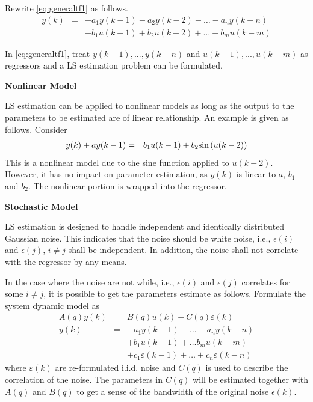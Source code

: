 Rewrite \eqref{eq:generaltf1} as follows.
\begin{eqnarray}
  y(k) &=& - a_1y(k-1) - a_2y(k-2) - \ldots - a_ny(k-n) \nonumber \\ && + b_1u(k-1) + b_2u(k-2) + \ldots + b_mu(k-m) \label{eq:generaltf1}
\end{eqnarray}

In \eqref{eq:generaltf1}, treat $y(k-1), ..., y(k-n)$ and $u(k-1), ..., u(k-m)$ as regressors and a LS estimation problem can be formulated.

\vspace{0.1in}
\noindent \textbf{Nonlinear Model}
\vspace{0.1in}

LS estimation can be applied to nonlinear models as long as the output to the parameters to be estimated are of linear relationship. An example is given as follows. Consider
\begin{eqnarray}
  y(k) + ay(k-1) &=& b_1u(k-1) + b_2 \textup{sin}\left(u(k-2)\right) \nonumber
\end{eqnarray}
This is a nonlinear model due to the sine function applied to $u(k-2)$. However, it has no impact on parameter estimation, as $y(k)$ is linear to $a$, $b_1$ and $b_2$. The nonlinear portion is wrapped into the regressor.

\vspace{0.1in}
\noindent \textbf{Stochastic Model}
\vspace{0.1in}

LS estimation is designed to handle independent and identically distributed Gaussian noise. This indicates that the noise should be white noise, i.e., $\epsilon(i)$ and $\epsilon(j)$, $i\neq j$ shall be independent. In addition, the noise shall not correlate with the regressor by any means.

In the case where the noise are not while, i.e., $\epsilon(i)$ and $\epsilon(j)$ correlates for some $i \neq j$, it is possible to get the parameters estimate as follows. Formulate the system dynamic model as
\begin{eqnarray}
  A(q)y(k) &=& B(q)u(k) + C(q)\varepsilon(k) \nonumber \\
  y(k) &=& -a_1y(k-1) - \ldots - a_ny(k-n) \nonumber \\ && + b_1u(k-1) + \ldots b_mu(k-m) \nonumber \\ && + c_1\varepsilon(k-1) + \ldots + c_n\varepsilon(k-n) \label{eq:stochasticls}
\end{eqnarray}
where $\varepsilon(k)$ are re-formulated i.i.d. noise and $C(q)$ is used to describe the correlation of the noise. The parameters in $C(q)$ will be estimated together with $A(q)$ and $B(q)$ to get a sense of the bandwidth of the original noise $\epsilon(k)$.

